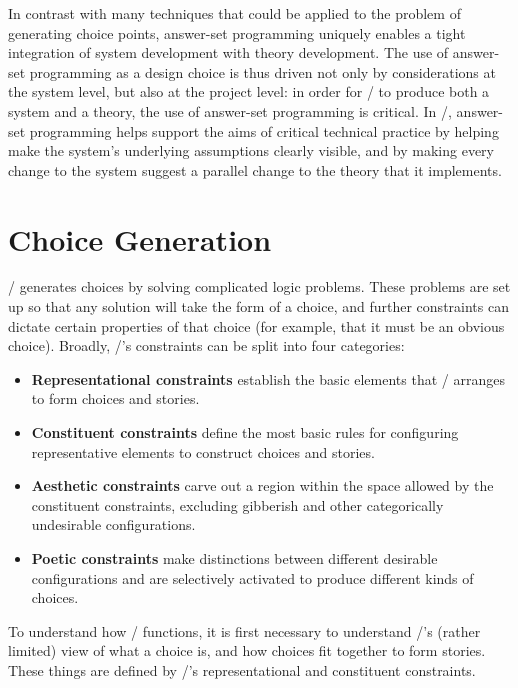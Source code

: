 In contrast with many techniques that could be applied to the problem of generating choice points, answer-set programming uniquely enables a tight integration of system development with theory development.
%
The use of answer-set programming as a design choice is thus driven not only by considerations at the system level, but also at the project level: in order for \dunyazad/ to produce both a system and a theory, the use of answer-set programming is critical.
%
In \dunyazad/, answer-set programming helps support the aims of critical technical practice by helping make the system's underlying assumptions clearly visible, and by making every change to the system suggest a parallel change to the theory that it implements.


\section{Choice Generation}
\label{sec:dunyazad-choice-generation}%

\dunyazad/ generates choices by solving complicated logic problems.
%
These problems are set up so that any solution will take the form of a choice, and further constraints can dictate certain properties of that choice (for example, that it must be an obvious choice).
%
Broadly, \dunyazad/'s constraints can be split into four categories:

\begin{itemize}
\item \textbf{Representational constraints} establish the basic elements that \dunyazad/ arranges to form choices and stories.
\item \textbf{Constituent constraints} define the most basic rules for configuring representative elements to construct choices and stories.
\item \textbf{Aesthetic constraints} carve out a region within the space allowed by the constituent constraints, excluding gibberish and other categorically undesirable configurations.
\item \textbf{Poetic constraints} make distinctions between different desirable configurations and are selectively activated to produce different kinds of choices.
\end{itemize}

To understand how \dunyazad/ functions, it is first necessary to understand \dunyazad/'s (rather limited) view of what a choice is, and how choices fit together to form stories.
%
These things are defined by \dunyazad/'s representational and constituent constraints.


